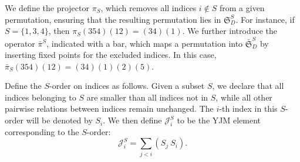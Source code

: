 \documentclass{article}
\theoremstyle{plain}
\theoremstyle{definition}
\numberwithin{equation}{section}
\begin{document}
We define the projector $\pi_S$, which removes all indices $i \notin S$ from a given permutation, ensuring that the resulting permutation lies in $\mathfrak{S}_D^S$. For instance, if $S = \{1,3,4\}$, then $\pi_S (3 5 4)(1 2) = (3 4)(1)$. We further introduce the operator $\bar{\pi}^S$, indicated with a bar, which maps a permutation into $\bar{\mathfrak{S}}_D^S$ by inserting fixed points for the excluded indices. In this case, $\bar{\pi}_S (3 5 4)(1 2) = (3 4)(1)(2)(5)$.

Define the $S$-order on indices as follows. Given a subset $S$, we declare that all indices belonging to $S$ are smaller than all indices not in $S$, while all other pairwise relations between indices remain unchanged. The $i$-th index in this $S$-order will be denoted by $S_i$. We then define $\mathcal{J}_i^S$ to be the YJM element corresponding to the $S$-order:
\[
\mathcal{J}_i^S = \sum_{j<i} (S_j \ S_i).
\]
\end{document}
